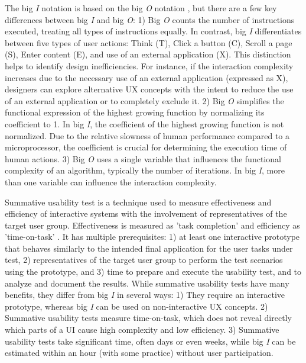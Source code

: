 The big \textit{I} notation is based on the big \textit{O} notation \cite{Bachmann1894-book,Knuth1976,Landauer1909-book}, but
there are a few key differences between big \textit{I} and big \textit{O}: 1) Big \textit{O} counts the number of instructions executed, treating all types of instructions equally. In contrast, big \textit{I} differentiates between five types of user actions: Think (T), Click a button (C), Scroll a page (S), Enter content (E), and use of an external application (X). This distinction helps to identify design inefficiencies. For instance, if the interaction complexity increases due to the necessary use of an external application (expressed as X), designers can explore alternative UX concepts with the intent to reduce the use of an external application or to completely exclude it. 2) Big \textit{O} simplifies the functional expression of the highest growing function by normalizing its coefficient to 1. In big \textit{I}, the coefficient of the highest growing function is not normalized. Due to the relative slowness of human performance compared to a microprocessor, the coefficient is crucial for determining the execution time of human actions. 3) Big \textit{O} uses a single variable that influences the functional complexity of an algorithm, typically the number of iterations. In big \textit{I}, more than one variable can influence the interaction complexity.

Summative usability test is a technique used to measure effectiveness and efficiency of interactive systems with the involvement of representatives of the target user group. Effectiveness is measured as 'task completion' and efficiency as 'time-on-task' \cite{ISO25062-2006,RubinChisnellSpool2008-UsabilityTesting-book}. It has multiple prerequisites: 1) at least one interactive prototype that behaves similarly to the intended final application for the user tasks under test, 2) representatives of the target user group to perform the test scenarios using the prototype, and 3) time to prepare and execute the usability test, and to analyze and document the results. While summative usability tests have many benefits, they differ from big \textit{I} in several ways: 1) They require an interactive prototype, whereas big \textit{I} can be used on non-interactive UX concepts. 2) Summative usability tests measure time-on-task, which does not reveal directly which parts of a UI cause high complexity and low efficiency. 3) Summative usability tests take significant time, often days or even weeks, while big \textit{I} can be estimated within an hour (with some practice) without user participation.

